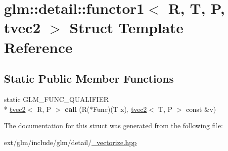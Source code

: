 \hypertarget{structglm_1_1detail_1_1functor1_3_01_r_00_01_t_00_01_p_00_01tvec2_01_4}{\section{glm\-:\-:detail\-:\-:functor1$<$ R, T, P, tvec2 $>$ Struct Template Reference}
\label{structglm_1_1detail_1_1functor1_3_01_r_00_01_t_00_01_p_00_01tvec2_01_4}
}
\subsection*{Static Public Member Functions}
\begin{DoxyCompactItemize}
\item 
\hypertarget{structglm_1_1detail_1_1functor1_3_01_r_00_01_t_00_01_p_00_01tvec2_01_4_aaabd54c114db7c12681014fcbcf763bf}{static G\-L\-M\-\_\-\-F\-U\-N\-C\-\_\-\-Q\-U\-A\-L\-I\-F\-I\-E\-R \\*
\hyperlink{structglm_1_1tvec2}{tvec2}$<$ R, P $>$ {\bfseries call} (R($\ast$Func)(T x), \hyperlink{structglm_1_1tvec2}{tvec2}$<$ T, P $>$ const \&v)}\label{structglm_1_1detail_1_1functor1_3_01_r_00_01_t_00_01_p_00_01tvec2_01_4_aaabd54c114db7c12681014fcbcf763bf}

\end{DoxyCompactItemize}


The documentation for this struct was generated from the following file\-:\begin{DoxyCompactItemize}
\item 
ext/glm/include/glm/detail/\hyperlink{__vectorize_8hpp}{\-\_\-vectorize.\-hpp}\end{DoxyCompactItemize}
